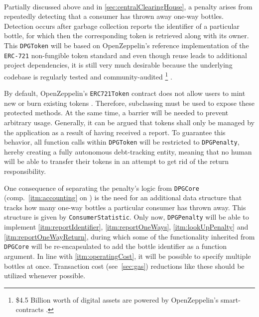 \begin{description}[format={\storedescriptionlabel}]
	\item[Penalty\label{itm:penalty}]
	\hfill \\
	Partially discussed above and in \autoref{sec:centralClearingHouse}, a penalty arises from repeatedly detecting that a consumer has thrown away one-way bottles. Detection occurs after garbage collection reports the identifier of a particular bottle, for which then the corresponding token is retrieved along with its owner. This \texttt{DPGToken} will be based on OpenZeppelin's reference implementation of the \texttt{\acs{ERC}-721} non-fungible token standard and even though reuse leads to additional project dependencies, it is still very much desirable because the underlying codebase is regularly tested and community-audited \footnote{\$4.5 Billion worth of digital assets are powered by OpenZeppelin's smart-contracts \cite{openZeppelin}.} \cite{openZeppelinGitHub}. 
	
	By default, OpenZeppelin's \texttt{ERC721Token} contract does not allow users to mint new or burn existing tokens \cite{openZeppelinGitHub}. Therefore, subclassing must be used to expose these protected methods. At the same time, a barrier will be needed to prevent arbitrary usage. Generally, it can be argued that tokens shall only be managed by the application as a result of having received a report. To guarantee this behavior, all function calls within \texttt{DPGToken} will be restricted to \texttt{DPGPenalty}, hereby creating a fully autonomous debt-tracking entity, meaning that no human will be able to transfer their tokens in an attempt to get rid of the return responsibility.
	
	One consequence of separating the penalty's logic from \texttt{DPGCore} (comp.~\ref{itm:accounting} on ) is the need for an additional data structure that tracks how many one-way bottles a particular consumer has thrown away. This structure is given by \texttt{ConsumerStatistic}. Only now, \texttt{DPGPenalty} will be able to implement \ref{itm:reportIdentifier}, \ref{itm:reportOneWays}, \ref{itm:lookUpPenalty} and \ref{itm:reportOneWayReturn}, during which some of the functionality inherited from \texttt{DPGCore} will be re-encapsulated to add the bottle identifier as a function argument. In line with \ref{itm:operatingCost}, it will be possible to specify multiple bottles at once. Transaction cost (see~\ref{sec:gas}) reductions like these should be utilized whenever possible.
\end{description}


